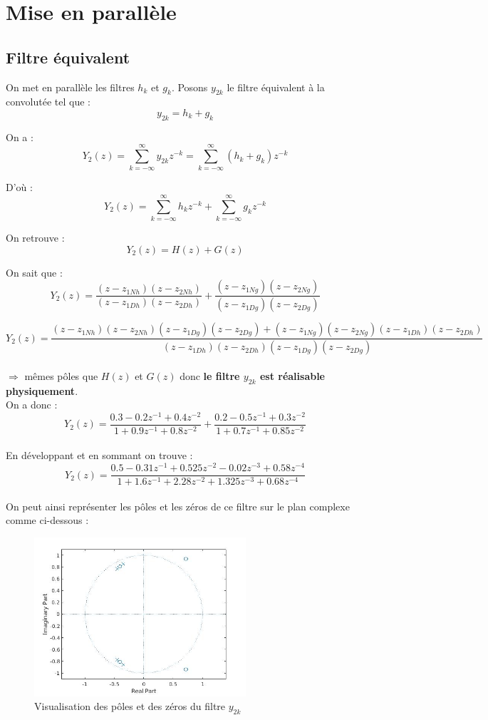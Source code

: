 \documentclass[12,french]{report}
\begin{document}
\chapter{Mise en parallèle}

\section{Filtre équivalent}

On met en parallèle les filtres $h_k$ et $g_k$. Posons $y_{2k}$ le filtre équivalent à la convolutée tel que : 
$$y_{2k}=h_k+g_k$$

On a :
$$ Y_2(z)=\sum_{k=-\infty}^{\infty}y_{2k}z^{-k}=\sum_{k=-\infty}^{\infty}(h_k+g_k)z^{-k} $$

D'où :
$$ Y_2(z)=\sum_{k=-\infty}^{\infty}h_kz^{-k}+\sum_{k=-\infty}^{\infty}g_kz^{-k} $$

On retrouve :
$$ Y_2(z)=H(z)+G(z)$$

On sait que :
$$ Y_2(z)= \frac{(z-z_{1Nh})(z-z_{2Nh})}{(z-z_{1Dh})(z-z_{2Dh})}+\frac{(z-z_{1Ng})(z-z_{2Ng})}{(z-z_{1Dg})(z-z_{2Dg})} $$

$$ Y_2(z)= \frac{(z-z_{1Nh})(z-z_{2Nh})(z-z_{1Dg})(z-z_{2Dg})+(z-z_{1Ng})(z-z_{2Ng})(z-z_{1Dh})(z-z_{2Dh})}{(z-z_{1Dh})(z-z_{2Dh})(z-z_{1Dg})(z-z_{2Dg})} $$\\
$\Longrightarrow$ mêmes pôles que $H(z)$ et $G(z)$ donc \textbf{le filtre $y_{2k}$ est réalisable physiquement}.\\


On a donc :\\
$$Y_2(z)=\frac{0.3-0.2z^{-1}+0.4z^{-2}}{1+0.9z^{-1}+0.8z^{-2}}+\frac{0.2-0.5z^{-1}+0.3z^{-2}}{1+0.7z^{-1}+0.85z^{-2}} $$\\

En développant et en sommant on trouve :
$$Y_2(z)=\frac{0.5-0.31z^{-1}+0.525z^{-2}-0.02z^{-3}+0.58z^{-4}}{1+1.6z^{-1}+2.28z^{-2}+1.325z^{-3}+0.68z^{-4}} $$\\

On peut ainsi représenter les pôles et les zéros de ce filtre sur le plan complexe comme ci-dessous :

\begin{figure}[H]
	\center
	\includegraphics[width=0.7\textwidth]{./Images/zplane_Y2}
	\caption{Visualisation des pôles et des zéros du filtre $y_{2k}$}
\end{figure}\vspace{0.2cm}
\end{document}
